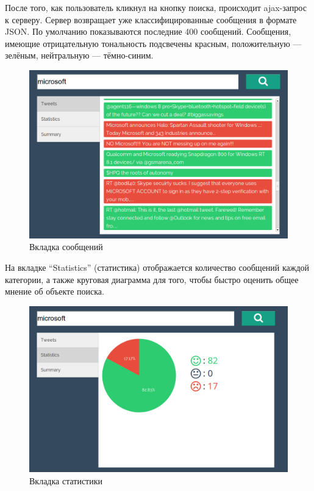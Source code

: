 После того, как пользователь кликнул на кнопку поиска, происходит ajax-запрос
к серверу. Сервер возвращает уже классифицированные сообщения в 
формате JSON. По умолчанию показываются последние 400 сообщений.
Сообщения, имеющие отрицательную тональность подсвечены красным, положительную --- зелёным, нейтральную --- тёмно-синим.
\begin{figure}[!ht]
\begin{center}
\includegraphics[scale=0.4, trim=0mm 0mm 0mm 0mm, clip]{../resources/screens/2.png}
\caption{Вкладка сообщений}
\label{gr:messages}
\end{center}
\end{figure} 

На вкладке ``Statistics'' (статистика) отображается количество сообщений каждой категории,
а также круговая диаграмма для того, чтобы быстро оценить общее мнение
об объекте поиска.
\begin{figure}[!ht]
\begin{center}
\includegraphics[scale=0.4, trim=0mm 0mm 0mm 0mm, clip]{../resources/screens/3.png}
\caption{Вкладка статистики}
\label{gr:stats}
\end{center}
\end{figure} 


